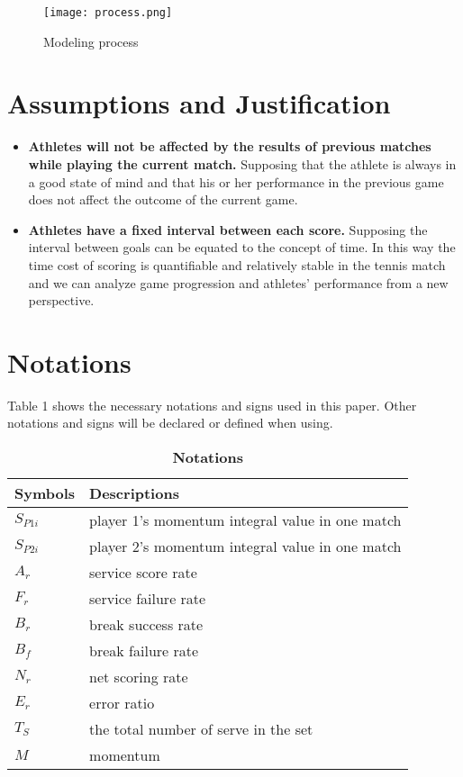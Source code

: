 \documentclass{mcmthesis}
\begin{document}
\begin{figure}[H]
    \centering
    \texttt{[image: process.png]}
    \caption{Modeling process} 
\end{figure}
\section{Assumptions and Justification}
\begin{itemize}

    \item {\bf Athletes will not be affected by the results of previous matches while playing the
    current match.} Supposing that the athlete is always in a good state of mind and that his or her
    performance in the previous game does not affect the outcome of the current game. 
    
    \item {\bf Athletes have a fixed interval between each score.} Supposing the interval between goals
    can be equated to the concept of time. In this way the time cost of scoring is quantifiable and
    relatively stable in the tennis match and we can analyze game progression and athletes' performance from a new perspective.

\end{itemize}
\section{Notations}
Table 1 shows the necessary notations and signs used in this paper. Other notations and signs
will be declared or defined when using.\cite{[2]}

\begin{table}[H]
    \centering
    \renewcommand{\arraystretch}{1} %
    \caption{\textbf{Notations}} %
    \vspace{0.5em} %
    \begin{tabularx}{\textwidth}{ll}
    \toprule[2pt]
    \textbf{Symbols} & \textbf{Descriptions} \\ 
    \midrule[1pt]
    $S_{P1i}$ & player 1's momentum integral value in one match \\ 
    $S_{P2i}$ & player 2's momentum integral value in one match \\ 
    $A_r$ & service score rate \\ 
    $F_r$ & service failure rate \\ 
    $B_r$ & break success rate \\ 
    $B_f$ & break failure rate \\ 
    $N_r$ & net scoring rate \\ 
    $E_r$ & error ratio \\ 
    $T_S$ & the total number of serve in the set \\ 
    $M$ & momentum \\ 
    \bottomrule[2pt]
    \end{tabularx}
    \label{Table:Notations}
\end{table}
\end{document}
